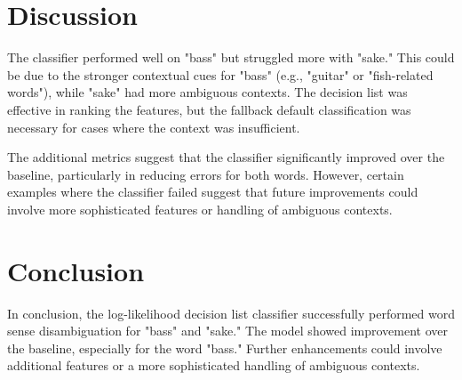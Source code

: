\documentclass[journal,onecolumn]{IEEEtran}
\begin{document}
\section{Discussion}
The classifier performed well on "bass" but struggled more with "sake." This could be due to the stronger contextual cues for "bass" (e.g., "guitar" or "fish-related words"), while "sake" had more ambiguous contexts. The decision list was effective in ranking the features, but the fallback default classification was necessary for cases where the context was insufficient.

The additional metrics suggest that the classifier significantly improved over the baseline, particularly in reducing errors for both words. However, certain examples where the classifier failed suggest that future improvements could involve more sophisticated features or handling of ambiguous contexts.

\section{Conclusion}
In conclusion, the log-likelihood decision list classifier successfully performed word sense disambiguation for "bass" and "sake." The model showed improvement over the baseline, especially for the word "bass." Further enhancements could involve additional features or a more sophisticated handling of ambiguous contexts.


\end{document}
